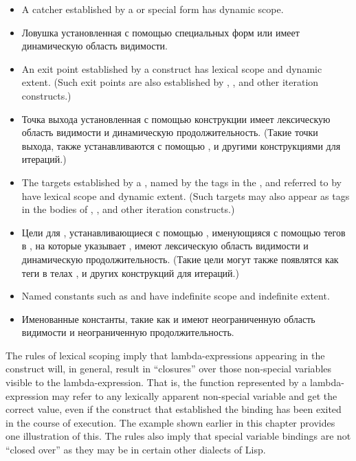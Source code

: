 \begin{itemize}
\item
A catcher established by a 
or  special form has dynamic
scope.

\item Ловушка установленная с помощью специальных форм  или
   имеет динамическую область видимости.

\item
An exit point established by a  construct has lexical
scope and dynamic extent.  (Such exit points are also established
by , , and other iteration constructs.)

\item
Точка выхода установленная с помощью конструкции  имеет лексическую
область видимости и динамическую продолжительность. (Такие точки выхода, также
устанавливаются с помощью ,  и другими конструкциями для итераций.)

\item
The  targets
established by a , named by the tags in the ,
and referred to by 
have lexical scope and dynamic extent.  (Such  targets
may also appear as tags in the bodies of
, , and other iteration constructs.)

\item
Цели для , устанавливающиеся с помощью , именующияся с
помощью тегов в , на которые указывает , имеют лексическую
область видимости и динамическую продолжительность. (Такие  цели могут
также появлятся как теги в телах ,  и других конструкций для итераций.)

\item
Named constants such as  and  have indefinite
scope and indefinite extent.

\item
Именованные константы, такие как  и  имеют неограниченную область
видимости и неограниченную продолжительность.
\end{itemize}

The rules of lexical scoping imply that lambda-expressions
appearing in the  construct will,
in general, result in ``closures''
over those non-special variables visible to the lambda-expression.
That is, the function represented by a lambda-expression
may refer to any lexically apparent non-special variable and get the
correct value, even if the construct that established the binding
has been exited in the course of execution.
The  example shown earlier in this chapter
provides one illustration of this.
The rules also imply that special variable bindings are not
``closed over'' as they may be in certain other dialects of Lisp.

